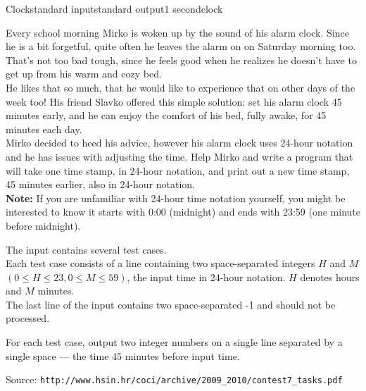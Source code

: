 \begin{problem}{Clock}{standard input}{standard output}{1 second}{clock}

Every school morning Mirko is woken up by the sound of his alarm clock. Since he is a bit forgetful, quite often he leaves the alarm on on Saturday morning too. That's not too bad tough, since he feels good when he realizes he doesn't have to get up from his warm and cozy bed.\\
He likes that so much, that he would like to experience that on other days of the week too! His friend Slavko offered this simple solution: set his alarm clock 45 minutes early, and he can enjoy the comfort of his bed, fully awake, for 45 minutes each day.\\
Mirko decided to heed his advice, however his alarm clock uses 24-hour notation and he has issues with adjusting the time. Help Mirko and write a program that will take one time stamp, in 24-hour notation, and print out a new time stamp, 45 minutes earlier, also in 24-hour notation.\\

\textbf{Note:} If you are unfamiliar with 24-hour time notation yourself, you might be interested to know it starts with 0:00 (midnight) and ends with 23:59 (one minute before midnight).


\InputFile

The input contains several test cases.\\
Each test case consists of a line containing two space-separated integers $H$ and $M$ $(0 \leq H \leq 23, 0 \leq M \leq 59)$, the input time in 24-hour notation. $H$ denotes hours and $M$ minutes.\\
The last line of the input contains two space-separated -1 and should not be processed.

\OutputFile

For each test case, output two integer numbers on a single line separated by a single space --- the time 45 minutes before input time.
\Example

\begin{example}
%
\end{example}

Source: \verb|http://www.hsin.hr/coci/archive/2009_2010/contest7_tasks.pdf|


\end{problem}
